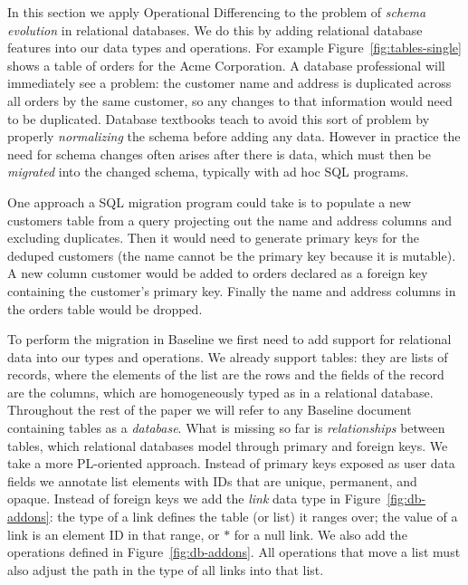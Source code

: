 \documentclass[english,submission]{programming}
\theoremstyle{definition}
\newcommand{\citet}[1]{\citeauthor*{#1}~\cite{#1}}
\newcommand{\mathbox}[1]{\colorbox{black!10}{$#1$\phantom{i\hspace{-3.5pt}}}}
\begin{document}
In this section we apply Operational Differencing to the problem of \textit{schema evolution} in relational databases. We do this by adding relational database features into our data types and operations.
For example Figure~\ref{fig:tables-single} shows a table of orders for the Acme Corporation. A database professional will immediately see a problem: the customer name and address is duplicated across all orders by the same customer, so any changes to that information would need to be duplicated.
Database textbooks teach to avoid this sort of problem by properly \textit{normalizing} the schema before adding any data. However in practice the need for schema changes often arises after there is data, which must then be \textit{migrated} into the changed schema, typically with ad hoc SQL programs.

One approach a SQL migration program could take is to populate a new \textsf{customers} table from a query projecting out the \textsf{name} and \textsf{address} columns and excluding duplicates. Then it would need to generate primary keys for the deduped customers (the name cannot be the primary key because it is mutable). A new column \textsf{customer} would be added to \textsf{orders} declared as a foreign key containing the customer's primary key. Finally the \textsf{name} and \textsf{address} columns in the \textsf{orders} table would be dropped.

To perform the migration in Baseline we first need to add support for relational data into our types and operations.
We already support tables: they are lists of records, where the elements of the list are the rows and the fields of the record are the columns, which are homogeneously typed as in a relational database.
Throughout the rest of the paper we will refer to any Baseline document containing tables as a \textit{database}.
What is missing so far is \textit{relationships} between tables, which relational databases model through primary and foreign keys. We take a more PL-oriented approach.
Instead of primary keys exposed as user data fields we annotate list elements with IDs that are unique, permanent, and opaque. Instead of foreign keys we add the \textit{link} data type in Figure~\ref{fig:db-addons}: the type of a link defines the table (or list) it ranges over; the value of a link is an element ID in that range, or \mathbox{*} for a null link. We also add the operations defined in Figure~\ref{fig:db-addons}. All operations that move a list must also adjust the path in the type of all links into that list.
\end{document}
